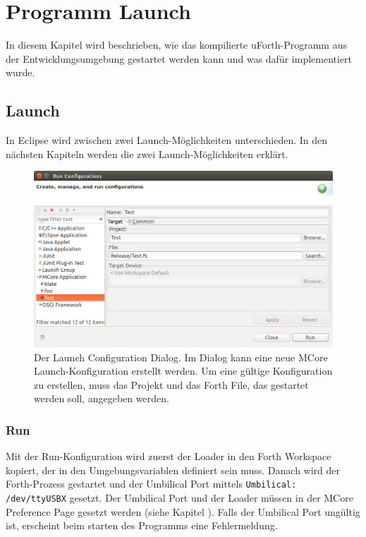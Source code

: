 \chapter{Programm Launch}
\label{chap:programlaunch}
In diesem Kapitel wird beschrieben, wie das kompilierte uForth-Programm aus der Entwicklungsumgebung gestartet werden kann und was dafür implementiert wurde.

\section{Launch}

In Eclipse wird zwischen zwei Launch-Möglichkeiten unterschieden. In den nächsten Kapiteln werden die zwei Launch-Möglichkeiten erklärt.

\begin{figure}[H]
	\centering
		\includegraphics[scale=0.3]{launch/run.png}
		\caption{Der Launch Configuration Dialog. Im Dialog kann eine neue MCore Launch-Konfiguration erstellt werden. Um eine gültige Konfiguration zu erstellen, muss das Projekt und das Forth File, das gestartet werden soll, angegeben werden.}
		\label{fig:run}
\end{figure}

\newpage
\subsection{Run}

Mit der Run-Konfiguration wird zuerst der Loader in den Forth Workspace kopiert, der in den Umgebungsvariablen definiert sein muss. Danach wird der Forth-Prozess gestartet und der Umbilical Port mittels \verb!Umbilical: /dev/ttyUSBX! gesetzt. Der Umbilical Port und der Loader müssen in der MCore Preference Page gesetzt werden (siehe Kapitel ). Falls der Umbilical Port ungültig ist, erscheint beim starten des Programms eine Fehlermeldung.

